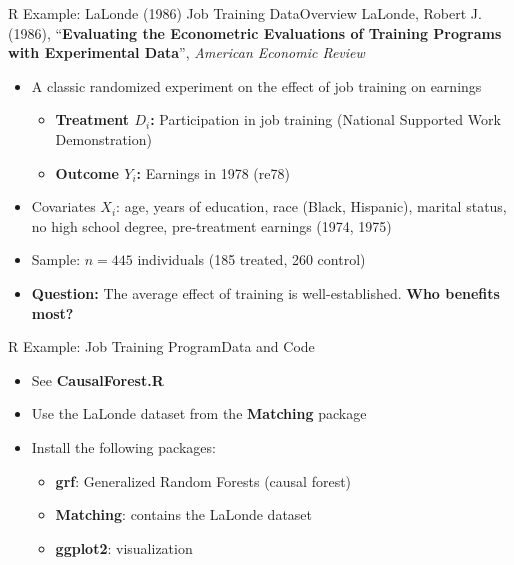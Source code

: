 \documentclass[dvipsnames,hyperref={pdfpagelabels=false}]{beamer}
\begin{document}
\begin{frame}{R Example: LaLonde (1986) Job Training Data}{Overview}
	LaLonde, Robert J. (1986), ``\textbf{Evaluating the Econometric Evaluations of Training Programs with Experimental Data}'', \textit{American Economic Review}

	\vspace{0.2cm}
	\begin{itemize}
		\item A classic randomized experiment on the effect of job training on earnings
		\vspace{0.2cm}
		\begin{itemize}
			\item \textbf{Treatment $D_i$:} Participation in job training (National Supported Work Demonstration)
			\vspace{0.2cm}
			\item \textbf{Outcome $Y_i$:} Earnings in 1978 (re78)
		\end{itemize}
		\vspace{0.2cm}
		\item Covariates $X_i$: age, years of education, race (Black, Hispanic), marital status, no high school degree, pre-treatment earnings (1974, 1975)
		\vspace{0.2cm}
		\item Sample: $n = 445$ individuals (185 treated, 260 control)
		\vspace{0.2cm}
		\item \textbf{Question:} The average effect of training is well-established. \textbf{Who benefits most?}
	\end{itemize}
\end{frame}




\begin{frame}[fragile]{R Example: Job Training Program}{Data and Code}
	\begin{itemize}
		\item See \textbf{CausalForest.R}
		\vspace{0.2cm}
		\item Use the LaLonde dataset from the \textbf{Matching} package
		\vspace{0.2cm}
		\item Install the following packages:
		\begin{itemize}
			\vspace{0.2cm}
			\item \textbf{grf}: Generalized Random Forests (causal forest)
			\vspace{0.2cm}
			\item \textbf{Matching}: contains the LaLonde dataset
			\vspace{0.2cm}
			\item \textbf{ggplot2}: visualization
		\end{itemize}
	\end{itemize}
\end{frame}
\end{document}
